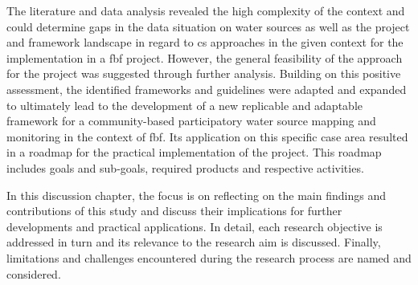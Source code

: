 The literature and data analysis revealed the high complexity of the context and could determine gaps in the data situation on water sources as well as the project and framework landscape in regard to \acrlong{cs} approaches in the given context for the implementation in a \acrshort{fbf} project. However, the general feasibility of the approach for the project was suggested through further analysis. Building on this positive assessment, the identified frameworks and guidelines were adapted and expanded to ultimately lead to the development of a new replicable and adaptable framework for a community-based participatory water source mapping and monitoring in the context of \acrlong{fbf}. Its application on this specific case area resulted in a roadmap for the practical implementation of the project. This roadmap includes goals and sub-goals, required products and respective activities.\newline

In this discussion chapter, the focus is on reflecting on the main findings and contributions of this study and discuss their implications for further developments and practical applications. In detail, each research objective is addressed in turn and its relevance to the research aim is discussed. Finally, limitations and challenges encountered during the research process are named and considered. 



